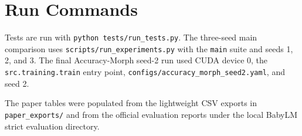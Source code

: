 \section{Run Commands}

Tests are run with \texttt{python tests/run\_tests.py}. The three-seed main comparison uses \texttt{scripts/run\_experiments.py} with the \texttt{main} suite and seeds 1, 2, and 3. The final Accuracy-Morph seed-2 run used CUDA device 0, the \texttt{src.training.train} entry point, \texttt{configs/accuracy\_morph\_seed2.yaml}, and seed 2.

The paper tables were populated from the lightweight CSV exports in \texttt{paper\_exports/} and from the official evaluation reports under the local BabyLM strict evaluation directory.
